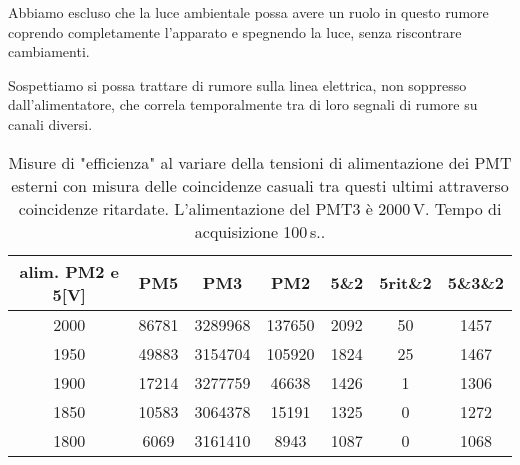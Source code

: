 Abbiamo escluso che la luce ambientale possa avere un ruolo in questo rumore coprendo completamente l'apparato e spegnendo la luce, senza riscontrare cambiamenti.

Sospettiamo si possa trattare di rumore sulla linea elettrica, non soppresso dall'alimentatore, che correla temporalmente tra di loro segnali di rumore su canali diversi.

\begin{table}
\centering
\begin{tabular}{c|c|c|c|c|c|c}
\hline
alim. PM2 e 5[V] & PM5 & PM3 & PM2 & 5\&2 & 5rit\&2 & 5\&3\&2 \\
\hline
2000 & 86781 & 3289968 & 137650 & 2092 & 50 & 1457 \\
1950 & 49883 & 3154704 & 105920 & 1824 & 25 & 1467 \\
1900 & 17214 & 3277759 & 46638 & 1426 & 1 & 1306 \\
1850 & 10583 & 3064378 & 15191 & 1325 & 0 & 1272 \\
1800 & 6069 & 3161410 & 8943 & 1087 & 0 & 1068 \\
\hline
\end{tabular}
\caption{Misure di "efficienza" al variare della tensioni di alimentazione dei PMT esterni con misura delle coincidenze casuali tra questi ultimi attraverso coincidenze ritardate. L'alimentazione del PMT3 è 2000\,V. Tempo di acquisizione 100\,s..}
\label{orrore}
\end{table}